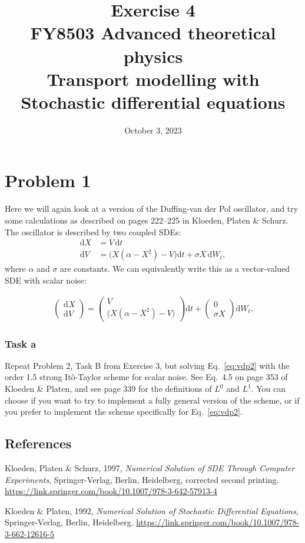 \documentclass[a4paper]{article}
\title{\vspace{-3em} Exercise 4\\[10pt] \large FY8503 Advanced theoretical physics\\  Transport modelling with Stochastic differential equations}
\author{October 3, 2023}
\date{}
\begin{document}
\maketitle



\section*{Problem 1}

Here we will again look at a version of the Duffing-van der Pol oscillator, and try some calculations as described on pages 222--225 in Kloeden, Platen \& Schurz. The oscillator is described by two coupled SDEs:
\begin{align}
    \label{eq:vdp}
\mathrm{d}X &= V\, \mathrm{d}t \\
\mathrm{d}V &= \big(X(\alpha-X^2) - V\big) \mathrm{d}t + \sigma X \, \mathrm{d}W_t,
\end{align}
where $\alpha$ and $\sigma$ are constants. We can equivalently write this as a vector-valued SDE with scalar noise:

\begin{align}
    \label{eq:vdp2}
\left(\begin{array}{c}\mathrm{d}X\\\mathrm{d}V\end{array}\right) = \left(\begin{array}{c}V\\ \big(X(\alpha-X^2) - V\big) \end{array}\right) \mathrm{d}t + \left(\begin{array}{c} 0 \\ \sigma X \end{array}\right) \mathrm{d}W_t.
\end{align}



\subsubsection*{Task a}

Repeat Problem 2, Task B from Exercise 3, but solving Eq.~\eqref{eq:vdp2} with the order 1.5 strong Itô-Taylor scheme for scalar noise. See Eq.~4.5 on page 353 of Kloeden \& Platen, and see page 339 for the definitions of $L^0$ and $L^1$. You can choose if you want to try to implement a fully general version of the scheme, or if you prefer to implement the scheme specifically for Eq.~\eqref{eq:vdp2}.


\subsection*{References}

Kloeden, Platen \& Schurz, 1997, \emph{Numerical Solution of SDE Through Computer Experiments}, Springer-Verlag, Berlin, Heidelberg, corrected second printing.
\url{https://link.springer.com/book/10.1007/978-3-642-57913-4}


Kloeden \& Platen, 1992, \emph{Numerical Solution of Stochastic Differential Equations}, Springer-Verlag, Berlin, Heidelberg.
\url{https://link.springer.com/book/10.1007/978-3-662-12616-5}
\end{document}
